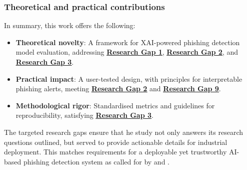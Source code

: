 
\subsubsection*{Theoretical and practical contributions}
In summary, this work offers the following:

\begin{itemize}
  \item \textbf{Theoretical novelty}: A framework for XAI-powered phishing detection model evaluation, addressing \hyperref[research-gap-1]{\uline{\textbf{Research Gap 1}}}, \hyperref[research-gap-2]{\uline{\textbf{Research Gap 2}}}, and \hyperref[research-gap-3]{\uline{\textbf{Research Gap 3}}}.
  \item \textbf{Practical impact}: A user-tested design, with principles for interpretable phishing alerts, meeting \hyperref[research-gap-2]{\uline{\textbf{Research Gap 2}}} and \hyperref[research-gap-9]{\uline{\textbf{Research Gap 9}}}.
  \item \textbf{Methodological rigor}: Standardised metrics and guidelines for reproducibility, satisfying \hyperref[research-gap-3]{\uline{\textbf{Research Gap 3}}}.
\end{itemize}

\noindent The targeted research gaps ensure that he study not only answers its research questions outlined, but served to provide actionable details for industrial deployment. This matches requirements for a deployable yet trustworthy AI-based phishing detection system as called for by \cite{atlam2022business} and \cite{lim2025explicate}.
